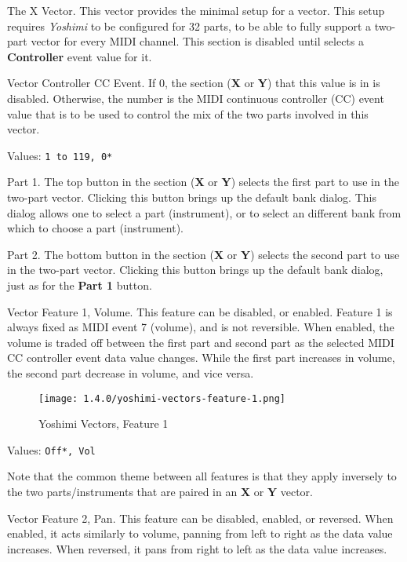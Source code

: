    The X Vector.
   This vector provides the minimal setup for a vector.  This setup requires
   \textsl{Yoshimi} to be configured for 32 parts, to be able to fully support
   a two-part vector for every MIDI channel.  This section is disabled until
   selects a \textbf{Controller} event value for it.

   Vector Controller CC Event.
   If 0, the section (\textbf{X} or \textbf{Y}) that this value is in is
   disabled.  Otherwise, the number is the MIDI continuous controller (CC)
   event value that is to be used to control the mix of the two parts involved
   in this vector.

   Values: \texttt{1 to 119, 0*}

   Part 1.
   The top button in the section (\textbf{X} or \textbf{Y}) selects the first
   part to use in the two-part vector.  Clicking this button brings up the
   default bank dialog.  This dialog allows one to select a part (instrument),
   or to select an different bank from which to choose a part (instrument).

   Part 2.
   The bottom button in the section (\textbf{X} or \textbf{Y}) selects the
   second part to use in the two-part vector.  Clicking this button brings up
   the default bank dialog, just as for the \textbf{Part 1} button.

   Vector Feature 1, Volume.
   This feature can be disabled, or enabled.  Feature 1 is always fixed as MIDI
   event 7 (volume), and is not reversible.
   When enabled, the volume is traded off between the first part and second part
   as the selected MIDI CC controller event data value changes.
   While the first part increases in volume, the second part decrease in
   volume, and vice versa.

\begin{figure}[H]
   \centering 
   \texttt{[image: 1.4.0/yoshimi-vectors-feature-1.png]}
   \caption{Yoshimi Vectors, Feature 1}
   \label{fig:yoshimi_vectors_feature_1}
\end{figure}

   Values: \texttt{Off*, Vol}

   Note that the common theme between all features is that they apply inversely
   to the two parts/instruments that are paired in an \textbf{X}
   or \textbf{Y} vector.

   Vector Feature 2, Pan.
   This feature can be disabled, enabled, or reversed.
   When enabled, it acts similarly to volume, panning from left to right as the
   data value increases.
   When reversed, it pans from right to left as the data value increases.

